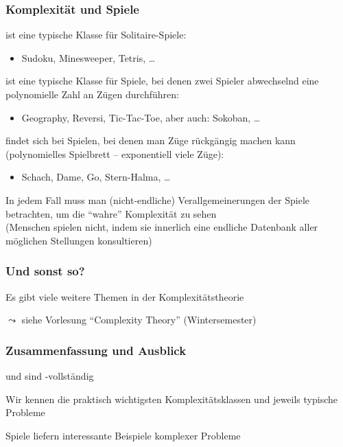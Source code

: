 \documentclass[aspectratio=1610,onlymath]{beamer}
\begin{document}
\begin{frame}\frametitle{Komplexität und Spiele}

\alert{\NP} ist eine typische Klasse für Solitaire-Spiele:
\begin{itemize}
\item Sudoku, Minesweeper, Tetris, \ldots
\end{itemize}
\bigskip\pause

\alert{\PSpace} ist eine typische Klasse für Spiele, bei denen zwei Spieler
abwechselnd eine polynomielle Zahl an Zügen durchführen:
\begin{itemize}
\item Geography, Reversi, Tic-Tac-Toe, aber auch: Sokoban, \ldots
\end{itemize}
\bigskip\pause

\alert{\ExpTime} findet sich bei Spielen, bei denen man Züge rückgängig machen kann (polynomielles Spielbrett -- exponentiell viele Züge):
\begin{itemize}
\item Schach, Dame, Go, Stern-Halma, \ldots
\end{itemize}
\smallskip

In jedem Fall muss man (nicht-endliche) Verallgemeinerungen der Spiele betrachten,
um die "`wahre"' Komplexität zu sehen\\ {\tiny(Menschen spielen nicht, indem sie
innerlich eine endliche Datenbank aller möglichen Stellungen konsultieren)}
\smallskip\pause



\end{frame}

\begin{frame}\frametitle{Und sonst so?}

Es gibt viele weitere Themen in der Komplexitätstheorie
\bigskip

$\leadsto$ siehe Vorlesung "`Complexity Theory"' (Wintersemester)

\end{frame}


\begin{frame}\frametitle{Zusammenfassung und Ausblick}

 und  sind \PSpace-vollständig
\bigskip

Wir kennen die praktisch wichtigsten Komplexitätsklassen und jeweils typische Probleme
\bigskip

Spiele liefern interessante Beispiele komplexer Probleme
\bigskip


\end{frame}
\end{document}

